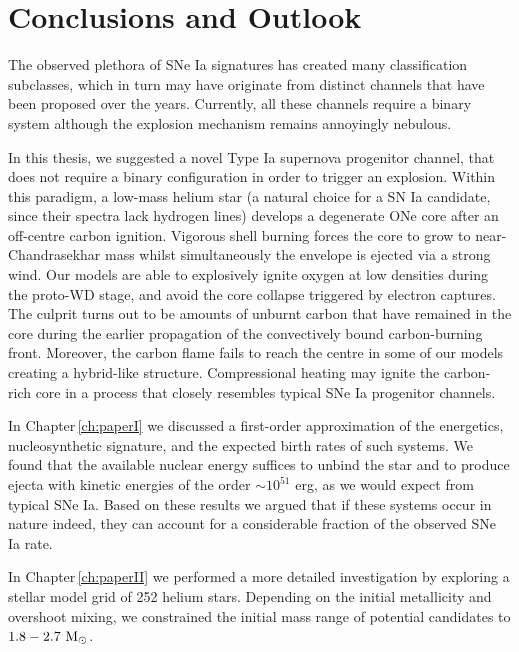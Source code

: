 \documentclass[../../main/thesis_msc.tex]{subfiles}
\begin{document}
\chapter{Conclusions and Outlook}
	
		The observed plethora of SNe Ia signatures has created many classification subclasses, which in turn may have originate from distinct channels that have been proposed over the years. Currently, all these channels require a binary system although the explosion mechanism remains annoyingly nebulous. 


		In this thesis, we suggested a novel Type Ia supernova progenitor channel, that does not require a binary configuration in order to trigger an explosion. Within this paradigm, a low-mass helium star (a natural choice for a SN Ia candidate, since their spectra lack hydrogen lines) develops a degenerate ONe core after an off-centre carbon ignition. Vigorous shell burning forces the core to grow to near-Chandrasekhar mass whilst simultaneously the envelope is ejected via a strong wind. Our models are able to explosively ignite oxygen at low densities during the proto-WD stage, and avoid the core collapse triggered by electron captures. The culprit turns out to be amounts of unburnt carbon that have remained in the core during the earlier propagation of the convectively bound carbon-burning front.
		Moreover, the carbon flame fails to reach the centre in some of our models creating a hybrid-like structure. Compressional heating may ignite the carbon-rich core in a process that closely resembles typical SNe Ia progenitor channels.
		
		
		In Chapter\,\ref{ch:paperI} we discussed a first-order approximation of the energetics, nucleosynthetic signature, and the expected birth rates of such systems. We found that the available nuclear energy suffices to unbind the star and to produce ejecta with kinetic energies of the order $\sim 10^{51}$ erg, as we would expect from typical SNe Ia. Based on these results we argued that if these systems occur in nature indeed, they can account for a considerable fraction of the observed SNe Ia rate.
		
		In Chapter\,\ref{ch:paperII} we performed a more detailed investigation by exploring a stellar model grid of 252 helium stars. Depending on the initial metallicity and overshoot mixing, we constrained the initial mass range of potential candidates to $\rm 1.8 - 2.7 \ M_{\odot}$.
		
		
		
\end{document}

